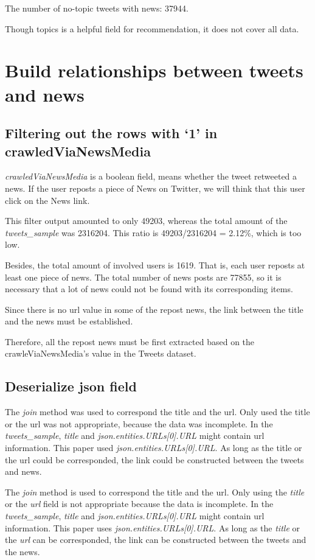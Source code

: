 The number of no-topic tweets with news: 37944.

Though topics is a helpful field for recommendation, it does not cover all data.

\section{Build relationships between tweets and news}

\subsection{Filtering out the rows with ‘1’ in crawledViaNewsMedia}
\textit{crawledViaNewsMedia} is a boolean field, means whether the tweet retweeted a news. If the user reposts a piece of News on Twitter, we will think that this user click on the News link. 

This filter output amounted to only 49203, whereas the total amount of the \textit{tweets\_sample} was 2316204. This ratio is 49203/2316204 = 2.12\%, which is too low.

Besides, the total amount of involved users is 1619. That is, each user reposts at least one piece of news. The total number of news posts are 77855, so it is necessary that a lot of news could not be found with its corresponding items.

Since there is no url value in some of the repost news, the link between the title and the news must be established.

Therefore, all the repost news must be first extracted based on the crawleViaNewsMedia’s value in the Tweets dataset.

\subsection{Deserialize json field}
The \textit{join} method was used to correspond the title and the url. Only used the title or the url was not appropriate, because the data was incomplete. In the \textit{tweets\_sample}, \textit{title} and \textit{json.entities.URLs[0].URL} might contain url information. This paper used \textit{json.entities.URLs[0].URL}. As long as the title or the url could be corresponded, the link could be constructed between the tweets and news.  

The \textit{join} method is used to correspond the title and the url. Only using the \textit{title} or the \textit{url} field is not appropriate because the data is incomplete. In the \textit{tweets\_sample}, \textit{title} and \textit{json.entities.URLs[0].URL} might contain url information. This paper uses \textit{json.entities.URLs[0].URL}. As long as the \textit{title} or the \textit{url} can be corresponded, the link can be constructed between the tweets and the news.

